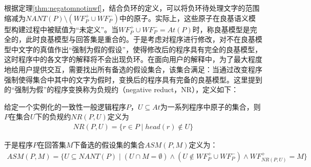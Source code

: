 根据定理\ref{thm:negatomnotinwf}，结合负环的定义，可以将负环待处理文字的范围缩减为$NANT(P) \setminus (WF^+_P \cup WF^-_P)$中的原子。实际上，这些原子在良基语义模型构建过程中被赋值为“未定义”。当$WF^+_P \cup WF^-_P = At(P)$时，称良基模型是完全的，此时良基模型与回答集是重合的。于是考虑对程序进行修改，对不在良基模型中文字的真值作出“强制为假的假设”，使得修改后的程序具有完全的良基模型，这时程序中的各文字的解释将不会出现负环。在面向用户的解释中，为了最大程度地给用户提供交互，需要找出所有备选的假设集合，该集合满足：当通过改变程序强制使得集合中其中的文字为假时，变换后的程序具有完备的良基模型。这里提到的“强制为假”的程序变换称为负规约（negative reduct，NR），定义如下：
\begin{definition}[负规约]
    给定一个实例化的一致性一般逻辑程序$P$，$U \subseteq At$为一系列程序中原子的集合，则$P$在集合$U$下的负规约$NR(P, U)$定义为
    \begin{align}
        NR(P, U) = \{r \in P \mid head(r) \notin U\}
    \label{eq:nrpu}
    \end{align}
\end{definition}
于是程序$P$在回答集$M$下备选的假设集的集合$ASM(P,M)$定义为：
\begin{align}
    ASM(P, M) = \{U \subseteq NANT(P) \mid (U \cap M = \emptyset) \land (U \notin WF^+_P \cup WF^-_P) \land WF^+_{NR(P,U)}=M\}
\label{eq:asm}
\end{align}

